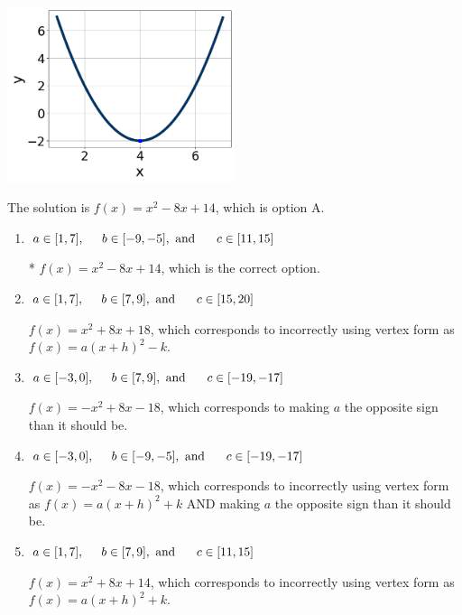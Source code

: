 \documentclass{extbook}[14pt]
\begin{document}
\begin{enumerate}
{\begin{center}
    \includegraphics[width=0.5\textwidth]{../Figures/quadraticGraphToEquationCopyA.png}
\end{center}


The solution is \( f(x) = x^{2} -8 x + 14 \), which is option A.\begin{enumerate}[label=\Alph*.]
\item \( a \in [1, 7], \hspace*{5mm} b \in [-9, -5], \text{ and } \hspace*{5mm} c \in [11, 15] \)

* $f(x)=x^{2} -8 x + 14$, which is the correct option.
\item \( a \in [1, 7], \hspace*{5mm} b \in [7, 9], \text{ and } \hspace*{5mm} c \in [15, 20] \)

$f(x)=x^{2} +8 x + 18$, which corresponds to incorrectly using vertex form as $f(x) = a(x+h)^2 - k$.
\item \( a \in [-3, 0], \hspace*{5mm} b \in [7, 9], \text{ and } \hspace*{5mm} c \in [-19, -17] \)

$f(x)=-x^{2} +8 x -18$, which corresponds to making $a$ the opposite sign than it should be.
\item \( a \in [-3, 0], \hspace*{5mm} b \in [-9, -5], \text{ and } \hspace*{5mm} c \in [-19, -17] \)

$f(x)=-x^{2} -8 x -18$, which corresponds to incorrectly using vertex form as $f(x) = a(x+h)^2+k$ AND making $a$ the opposite sign than it should be.
\item \( a \in [1, 7], \hspace*{5mm} b \in [7, 9], \text{ and } \hspace*{5mm} c \in [11, 15] \)

$f(x)=x^{2} +8 x + 14$, which corresponds to incorrectly using vertex form as $f(x) = a(x+h)^2+k$.
\end{enumerate}

}
\end{enumerate}
\end{document}
